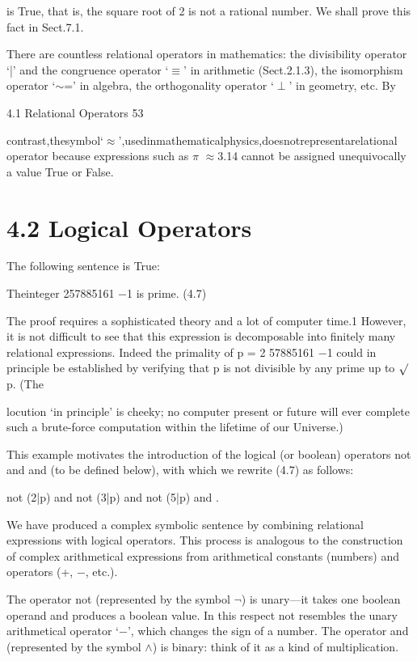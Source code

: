 \documentclass[11pt]{article}
\theoremstyle{plain}
\theoremstyle{definition}
\begin{document}
is True, that is, the square root of 2 is not a rational number. We shall prove this fact in Sect.7.1.

There are countless relational operators in mathematics: the divisibility operator `|' and the congruence operator `$\equiv$' in arithmetic (Sect.2.1.3), the isomorphism operator `$\sim$=' in algebra, the orthogonality operator `$\perp$' in geometry, etc. By

4.1 Relational Operators 53

contrast,thesymbol`$\approx$',usedinmathematicalphysics,doesnotrepresentarelational operator because expressions such as $\pi$ $\approx$3.14 cannot be assigned unequivocally a value True or False.

\section{4.2 Logical Operators}

The following sentence is True:

Theinteger 257885161 $-$1 is prime. (4.7)

The proof requires a sophisticated theory and a lot of computer time.1 However, it is not difficult to see that this expression is decomposable into finitely many relational expressions. Indeed the primality of p = 2 57885161 $-$1 could in principle be established by verifying that p is not divisible by any prime up to $\surd$p. (The

locution `in principle' is cheeky; no computer present or future will ever complete such a brute-force computation within the lifetime of our Universe.)

This example motivates the introduction of the logical (or boolean) operators not and and (to be defined below), with which we rewrite (4.7) as follows:

not (2|p) and not (3|p) and not (5|p) and \textperiodcentered{} \textperiodcentered{} \textperiodcentered{} .

We have produced a complex symbolic sentence by combining relational expressions with logical operators. This process is analogous to the construction of complex arithmetical expressions from arithmetical constants (numbers) and operators (+, $-$, etc.).

The operator not (represented by the symbol $\neg$) is unary---it takes one boolean operand and produces a boolean value. In this respect not resembles the unary arithmetical operator `$-$', which changes the sign of a number. The operator and (represented by the symbol $\land$) is binary: think of it as a kind of multiplication.
\end{document}
